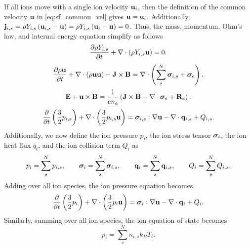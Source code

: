 \documentclass[a4paper,11pt]{report}
\begin{document}
If all ions move with a single ion velocity $\mathbf{u}_i$, then the definition of the common velocity $\mathbf{u}$ in \cref{eq:sf_common_vel} gives $\mathbf{u} = \mathbf{u}_i$. Additionally, $\mathbf{j}_{i,s} = \rho Y_{i,s} \left( \mathbf{u}_{i,s} - \mathbf{u} \right) = \rho Y_{i,s} \left( \mathbf{u}_i - \mathbf{u} \right) = 0$. Thus, the mass, momentum, Ohm's law, and internal energy equation simplify as follows
\begin{equation*}
    \frac{\partial \rho Y_{i,s}}{\partial t} + \nabla \cdot \left( \rho Y_{i,s} \mathbf{u} \right) = 0.
\end{equation*}
\begin{equation*}
    \frac{\partial \rho \mathbf{u}}{\partial t} + \nabla \cdot \left( \rho \mathbf{u} \mathbf{u} \right) - \mathbf{J} \times \mathbf{B} = \nabla \cdot \left( \sum_s^N \bm \sigma_{i,s} + \bm \sigma_e \right).
\end{equation*}
\begin{equation*}
    \mathbf{E} + \mathbf{u} \times \mathbf{B} = \frac{1}{e n_e} \left( \mathbf{J} \times \mathbf{B} + \nabla \cdot \bm \sigma_e + \mathbf{R}_e \right) .
\end{equation*}
\begin{equation*}
    \frac{\partial}{\partial t} \left( \frac{3}{2} p_{i,s} \right) + \nabla \cdot \left( \frac{3}{2} p_{i,s} \mathbf{u} \right) = \bm \sigma_{i,s} : \nabla \mathbf{u} - \nabla \cdot \mathbf{q}_{i,s} + Q_{i,s}.
\end{equation*}
Additionally, we now define the ion pressure $p_i$, the ion stress tensor $\bm \sigma_i$, the ion heat flux $q_i$, and the ion collision term $Q_i$ as
\begin{equation*}
    p_i = \sum_s^N p_{i,s},
\qquad
    \bm \sigma_i = \sum_s^N \bm \sigma_{i,s},
\qquad
    \mathbf{q}_i = \sum_s^N \mathbf{q}_{i,s},
\qquad
    Q_i = \sum_s^N Q_{i,s}.
\end{equation*}
Adding over all ion species, the ion pressure equation becomes
\begin{equation*}
    \frac{\partial}{\partial t} \left( \frac{3}{2} p_i \right) + \nabla \cdot \left( \frac{3}{2} p_i \mathbf{u} \right) = \bm \sigma_i : \nabla \mathbf{u} - \nabla \cdot \mathbf{q}_i + Q_i.
\end{equation*}
Similarly, summing over all ion species, the ion equation of state becomes
\begin{equation*}
    p_i = \sum_s^N n_{i,s} k_B T_i.
\end{equation*}
\end{document}
